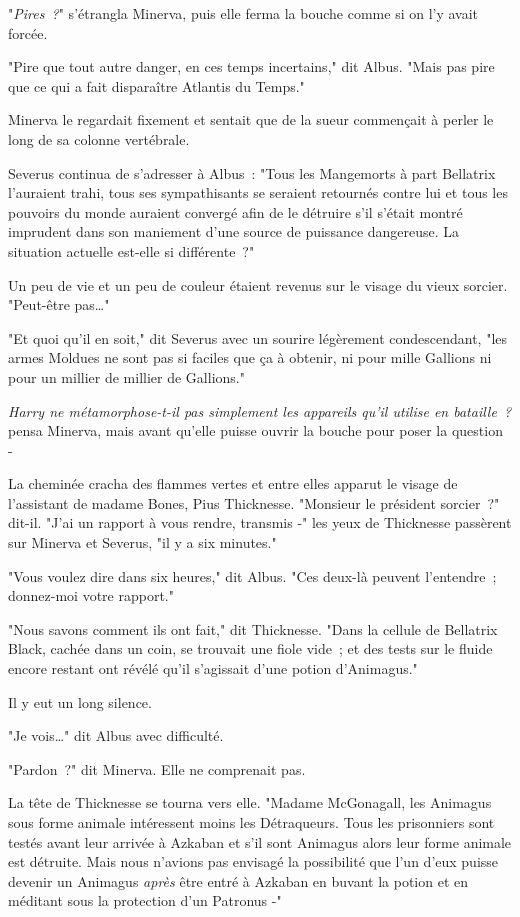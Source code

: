 "\emph{Pires~?}" s'étrangla Minerva, puis elle ferma la bouche comme si on l'y avait forcée.

"Pire que tout autre danger, en ces temps incertains," dit Albus. "Mais pas pire que ce qui a fait disparaître Atlantis du Temps."

Minerva le regardait fixement et sentait que de la sueur commençait à perler le long de sa colonne vertébrale.

Severus continua de s'adresser à Albus~: "Tous les Mangemorts à part Bellatrix l'auraient trahi, tous ses sympathisants se seraient retournés contre lui et tous les pouvoirs du monde auraient convergé afin de le détruire s'il s'était montré imprudent dans son maniement d'une source de puissance dangereuse. La situation actuelle est-elle si différente~?"

Un peu de vie et un peu de couleur étaient revenus sur le visage du vieux sorcier. "Peut-être pas…"

"Et quoi qu'il en soit," dit Severus avec un sourire légèrement condescendant, "les armes Moldues ne sont pas si faciles que ça à obtenir, ni pour mille Gallions ni pour un millier de millier de Gallions."

\emph{Harry ne métamorphose-t-il pas simplement les appareils qu'il utilise en bataille~?} pensa Minerva, mais avant qu'elle puisse ouvrir la bouche pour poser la question -

La cheminée cracha des flammes vertes et entre elles apparut le visage de l'assistant de madame Bones, Pius Thicknesse. "Monsieur le président sorcier~?" dit-il. "J'ai un rapport à vous rendre, transmis -" les yeux de Thicknesse passèrent sur Minerva et Severus, "il y a six minutes."

"Vous voulez dire dans six heures," dit Albus. "Ces deux-là peuvent l'entendre~; donnez-moi votre rapport."

"Nous savons comment ils ont fait," dit Thicknesse. "Dans la cellule de Bellatrix Black, cachée dans un coin, se trouvait une fiole vide~; et des tests sur le fluide encore restant ont révélé qu'il s'agissait d'une potion d'Animagus."

Il y eut un long silence.

"Je vois…" dit Albus avec difficulté.

"Pardon~?" dit Minerva. Elle ne comprenait pas.

La tête de Thicknesse se tourna vers elle. "Madame McGonagall, les Animagus sous forme animale intéressent moins les Détraqueurs. Tous les prisonniers sont testés avant leur arrivée à Azkaban et s'il sont Animagus alors leur forme animale est détruite. Mais nous n'avions pas envisagé la possibilité que l'un d'eux puisse devenir un Animagus \emph{après} être entré à Azkaban en buvant la potion et en méditant sous la protection d'un Patronus -"

